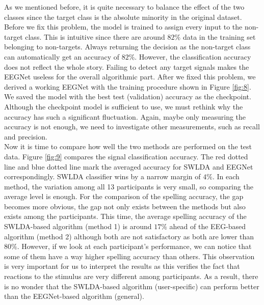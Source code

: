 \documentclass{article}
\begin{document}
\vspace{-3mm}
As we mentioned before, it is quite necessary to balance the effect of the two classes since the target class is the absolute minority in the original dataset. Before we fix this problem, the model is trained to assign every input to the non-target class. This is intuitive since there are around $82\%$ data in the training set belonging to non-targets. Always returning the decision as the non-target class can automatically get an accuracy of $82\%$. However, the classification accuracy does not reflect the whole story. Failing to detect any target signals makes the EEGNet useless for the overall algorithmic part. After we fixed this problem, we derived a working EEGNet with the training procedure shown in Figure  \ref{fig:8}. We saved the model with the best test (validation) accuracy as the checkpoint. Although the checkpoint model is sufficient to use, we must rethink why the accuracy has such a significant fluctuation. Again, maybe only measuring the accuracy is not enough, we need to investigate other measurements, such as recall and precision.\\

\vspace{-3mm}
Now it is time to compare how well the two methods are performed on the test data. Figure \ref{fig:9} compares the signal classification accuracy. The red dotted line and blue dotted line mark the averaged accuracy for SWLDA and EEGNet correspondingly. SWLDA classifier wins by a narrow margin of $4\%$. In each method, the variation among all 13 participants is very small, so comparing the average level is enough. For the comparison of the spelling accuracy, the gap becomes more obvious, the gap not only exists between the methods but also exists among the participants. This time, the average spelling accuracy of the SWLDA-based algorithm (method 1) is around $17\%$ ahead of the EEG-based algorithm (method 2) although both are not satisfactory as both are lower than $80\%$. However, if we look at each participant's performance, we can notice that some of them have a way higher spelling accuracy than others. This observation is very important for us to interpret the results as this verifies the fact that reactions to the stimulus are very different among participants. As a result, there is no wonder that the SWLDA-based algorithm (user-specific) can perform better than the EEGNet-based algorithm (general).
\end{document}
